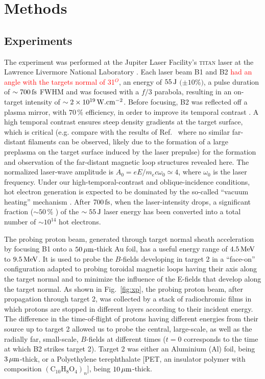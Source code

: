 \documentclass[aps,twocolumn,showpacs,superscriptaddress]{revtex4}
\begin{document}
\section*{Methods}
\subsection*{Experiments}
The experiment %
was performed at the Jupiter Laser Facility's \textsc{titan} laser at the Lawrence Livermore National Laboratory \cite{RSI_Albertazzi_2015}. Each laser beam B1 and B2 \textcolor{red}{had an angle with the targets normal of 31$^O$}, an energy of $55\,\rm J$ $(\pm 10$\%$)$, a pulse duration of $\sim 700\,\rm fs$ FWHM and was focused with a $f/3$ parabola, resulting in an on-target intensity of $\sim 2\times 10^{19}\,\rm W.cm^{-2}$. Before focusing, B2 was reflected off a plasma mirror, with $70\,\%$ efficiency, in order to improve its temporal contrast \cite{PRE_Doumy_2004}. 
A high temporal contrast ensures steep density gradients at the target surface, which is critical (e.g. compare with the results of Ref.~\cite{PRL_Sarri_2012} where no similar far-distant filaments can be observed, likely due to the formation of a large preplasma on the target surface induced by the laser prepulse) for the formation and observation of the far-distant magnetic loop structures revealed here. The normalized laser-wave amplitude is $A_0 = eE/m_ec\omega_0 \simeq 4$, where $\omega_0$ is the laser frequency. Under our high-temporal-contrast and oblique-incidence conditions, hot electron generation is expected to be dominated by the so-called ``vacuum heating'' mechanism \cite{PRL_Brunel_1987}. After $700\,\rm fs$, when the laser-intensity drops, a significant fraction ($\sim 50\,\%$ \cite{PRL_Ping_2008}) of the $\sim 55\, \rm J$ laser energy has been converted into a total number of $\sim 10^{14}$ hot electrons.

The probing proton beam, generated through target normal sheath acceleration \cite{PRL_Fuchs_2003} by focusing B1 onto a $50\,\rm \mu m$-thick Au foil, has a useful energy range of $4.5\,\rm MeV$ to $9.5\,\rm MeV$. It is used to probe the $B$-fields developing in target 2 in a ``face-on'' configuration \cite{RSI_Albertazzi_2015} adapted to probing toroidal magnetic loops having their axis along the target normal and to minimize the influence of the E-fields that develop along the target normal. As shown in Fig.~\ref{fig:xp}, the probing proton beam, after propagation through target 2, was collected by a stack of radiochromic films in which protons are stopped in different layers according to their incident energy. The difference in the time-of-flight of protons having different energies from their source up to target 2 allowed us to probe the central, large-scale, as well as the radially far, small-scale, $B$-fields at different times ($t=0$ corresponds to the time at which B2 strikes target 2).
Target 2 was either an Aluminium (Al) foil, being $3\,\rm \mu m$-thick, or a Polyethylene terephthalate [PET, an insulator polymer with composition $(\mathrm{C}_{10}\mathrm{H}_8\mathrm{O}_4)_n$], being $10\,\rm \mu m$-thick.
 
\end{document}
